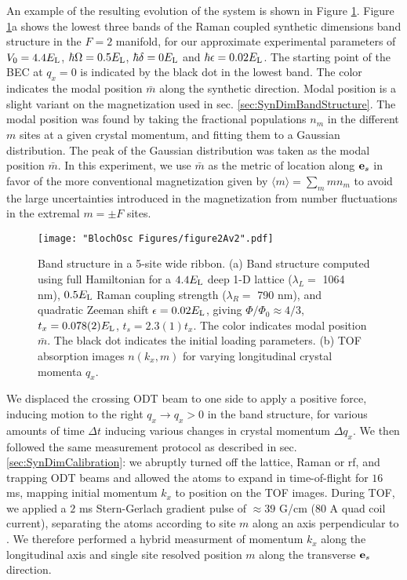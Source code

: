 An example of the resulting evolution of the system is shown in Figure \ref{fig:kickBsTOF}. Figure \ref{fig:kickBsTOF}a shows the lowest three bands of the Raman coupled synthetic dimensions band structure in the $F=2$ manifold, for our approximate experimental parameters of $V_0 = 4.4 E_{\rm L}$, $\hbar\Omega = 0.5 E_{\rm L}$, $\hbar\delta = 0 E_{\rm L}$ and $\hbar\epsilon = 0.02 E_{\rm L}$. The starting point of the BEC at $q_x=0$ is indicated by the black dot in the lowest band. The color indicates the modal position $\bar{m}$ along the synthetic direction. Modal position is a slight variant on the magnetization used in sec. \ref{sec:SynDimBandStructure}. The modal position was found by taking the fractional populations $n_{m}$ in the different $m$ sites at a given crystal momentum, and fitting them to a Gaussian distribution. The peak of the Gaussian distribution was taken as the modal position $\bar{m}$. In this experiment, we use $\bar{m}$ as the metric of location along $\textbf{e}_s{}$ in favor of the more conventional magnetization given by $\langle m\rangle=\sum_{m}m n_{m}$ to avoid the large uncertainties introduced in the magnetization from number fluctuations in the extremal $m=\pm F$ sites. 
\begin{figure}
\texttt{[image: "BlochOsc Figures/figure2Av2".pdf]}
\caption[Band structure in a 5-site wide ribbon]{Band structure in a 5-site wide ribbon. (a) Band structure computed using full Hamiltonian for a $4.4 E_{\rm L}$ deep 1-D lattice ($\lambda_L=$ 1064 nm), $0.5 E_{\rm L}$ Raman coupling strength ($\lambda_R = $ 790 nm), and quadratic Zeeman shift $\epsilon=0.02 E_{\rm L}$, giving $\Phi/\Phi_0 \approx 4/3$, $t_x = 0.078(2) E_{\rm L}$, $t_s=2.3(1) t_x$. The color indicates modal position $\bar{m}$. The black dot indicates the initial loading parameters.  (b) TOF absorption images $n(k_x,m)$ for varying longitudinal crystal momenta $q_x$.  }
\label{fig:kickBsTOF}
\end{figure}

We displaced the crossing ODT beam to one side to apply a positive force, inducing motion to the right $q_x\rightarrow q_x>0$ in the band structure, for various amounts of time $\Delta t$ inducing various changes in crystal momentum $\Delta q_x$. We then followed the same measurement protocol as described in sec. \ref{sec:SynDimCalibration}: we abruptly turned off the lattice, Raman or rf, and trapping ODT beams and allowed the atoms to expand in time-of-flight for $16$ ms, mapping initial momentum $k_x$ to position on the TOF images.  During TOF, we applied a $2$ ms Stern-Gerlach gradient pulse of $\approx 39$ G/cm ($80$ A quad coil current), separating the atoms according to site $m$ along an axis perpendicular to \ex{}. We therefore performed a hybrid measurment of momentum $k_x$ along the longitudinal \ex{} axis and single site resolved position $m$ along the transverse $\textbf{e}_s{}$ direction. 

